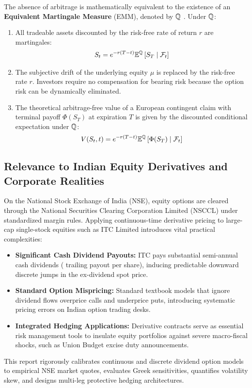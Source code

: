 The absence of arbitrage is mathematically equivalent to the existence of an \textbf{Equivalent Martingale Measure} (EMM), denoted by $\mathbb{Q}$ \citep{hull2018options}. Under $\mathbb{Q}$:
\begin{enumerate}[leftmargin=1.5em, itemsep=1pt, parsep=0pt, label=(\roman*)]
    \item All tradeable assets discounted by the risk-free rate of return $r$ are martingales:
    \begin{equation}
        S_t = e^{-r(T-t)} \mathbb{E}^{\mathbb{Q}} \left[ S_T \;\middle|\; \mathcal{F}_t \right]
        \label{eq:martingale_property}
    \end{equation}
    \item The subjective drift of the underlying equity $\mu$ is replaced by the risk-free rate $r$. Investors require no compensation for bearing risk because the option risk can be dynamically eliminated.
    \item The theoretical arbitrage-free value of a European contingent claim with terminal payoff $\Phi(S_T)$ at expiration $T$ is given by the discounted conditional expectation under $\mathbb{Q}$:
    \begin{equation}
        V(S_t, t) = e^{-r(T-t)} \mathbb{E}^{\mathbb{Q}} \left[ \Phi(S_T) \;\middle|\; \mathcal{F}_t \right]
        \label{eq:risk_neutral_expectation}
    \end{equation}
\end{enumerate}

\subsection{Relevance to Indian Equity Derivatives and Corporate Realities}

On the National Stock Exchange of India (NSE), equity options are cleared through the National Securities Clearing Corporation Limited (NSCCL) under standardized margin rules. Applying continuous-time derivative pricing to large-cap single-stock equities such as ITC Limited introduces vital practical complexities:
\begin{itemize}[leftmargin=1.5em, itemsep=1pt, parsep=0pt]
    \item \textbf{Significant Cash Dividend Payouts:} ITC pays substantial semi-annual cash dividends ( trailing payout per share), inducing predictable downward discrete jumps in the ex-dividend spot price.
    \item \textbf{Standard Option Mispricing:} Standard textbook models that ignore dividend flows overprice calls and underprice puts, introducing systematic pricing errors on Indian option trading desks.
    \item \textbf{Integrated Hedging Applications:} Derivative contracts serve as essential risk management tools to insulate equity portfolios against severe macro-fiscal shocks, such as Union Budget excise duty announcements.
\end{itemize}

This report rigorously calibrates continuous and discrete dividend option models to empirical NSE market quotes, evaluates Greek sensitivities, quantifies volatility skew, and designs multi-leg protective hedging architectures.

\clearpage
